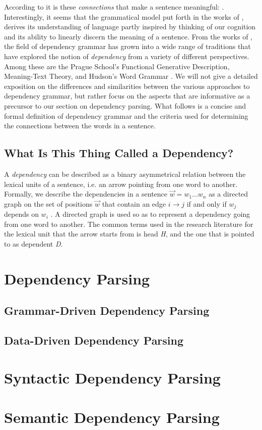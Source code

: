 According to \citeauthor{Tes:15} it is these \textit{connections} that make a sentence meaningful:  \cite{Tes:15}. Interestingly, it seems that the grammatical model put forth in the works of \citeauthor{Tes:15}, derives its understanding of language partly inspired by thinking of our cognition and its ability to linearly discern the meaning of a sentence. From the works of \citeauthor{Tes:15}, the field of dependency grammar has grown into a wide range of traditions that have explored the notion of \textit{dependency} from a variety of different perspectives. Among these are the Prague School's Functional Generative Description, Meaning-Text Theory, and Hudson's Word Grammar \cite{Sgall:86, Mel:88, Hudson:90}. We will not give a detailed exposition on the differences and similarities between the various approaches to dependency grammar, but rather focus on the aspects that are informative as a precursor to our section on dependency parsing. What follows is a concise and formal definition of dependency grammar and the criteria used for determining the connections between the words in a sentence.

\subsection{What Is This Thing Called a Dependency?}
A \textit{dependency} can be described as a binary asymmetrical relation between the lexical units of a sentence, i.e. an arrow pointing from one word to another. Formally, we describe the dependencies in a sentence $\vec{w} = w_1 ... w_n$ as a directed graph on the set of positions $\vec{w}$ that contain an edge $i \rightarrow j$ if and only if $w_j$ depends on $w_i$ \cite{Kuhl:10}. A directed graph is used so as to represent a dependency going from one word to another. The common terms used in the research literature for the lexical unit that the arrow starts from is head \textit{H}, and the one that is pointed to as dependent \textit{D}. 

\section{Dependency Parsing}
\subsection{Grammar-Driven Dependency Parsing}
\subsection{Data-Driven Dependency Parsing}


\section{Syntactic Dependency Parsing}


\section{Semantic Dependency Parsing}